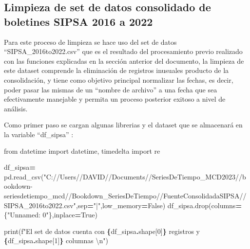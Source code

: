 \documentclass[
]{book}
\newenvironment{Shaded}{\begin{snugshade}}{\end{snugshade}}
\newcommand{\BuiltInTok}[1]{#1}
\newcommand{\CharTok}[1]{\textcolor[rgb]{0.31,0.60,0.02}{#1}}
\newcommand{\DecValTok}[1]{\textcolor[rgb]{0.00,0.00,0.81}{#1}}
\newcommand{\ImportTok}[1]{#1}
\newcommand{\NormalTok}[1]{#1}
\newcommand{\OperatorTok}[1]{\textcolor[rgb]{0.81,0.36,0.00}{\textbf{#1}}}
\newcommand{\SpecialCharTok}[1]{\textcolor[rgb]{0.81,0.36,0.00}{\textbf{#1}}}
\newcommand{\SpecialStringTok}[1]{\textcolor[rgb]{0.31,0.60,0.02}{#1}}
\newcommand{\StringTok}[1]{\textcolor[rgb]{0.31,0.60,0.02}{#1}}
\newcommand{\VariableTok}[1]{\textcolor[rgb]{0.00,0.00,0.00}{#1}}
\begin{document}
\hypertarget{limpieza-de-set-de-datos-consolidado-de-boletines-sipsa-2016-a-2022}{%
\subsection{Limpieza de set de datos consolidado de boletines SIPSA 2016 a 2022}\label{limpieza-de-set-de-datos-consolidado-de-boletines-sipsa-2016-a-2022}}

Para este proceso de limpieza se hace uso del set de datos ``SIPSA\_2016to2022.csv'' que es el resultado del procesamiento previo realizado con las funciones explicadas en la sección anterior del documento, la limpieza de este dataset comprende la eliminación de registros inusuales producto de la consolidación, y tiene como objetivo principal normalizar las fechas, es decir, poder pasar las mismas de un ``nombre de archivo'' a una fecha que sea efectivamente manejable y permita un proceso posterior exitoso a nivel de análisis.

Como primer paso se cargan algunas librerias y el dataset que se almacenará en la variable ``df\_sipsa'' :

\begin{Shaded}
\begin{Highlighting}[]

\ImportTok{from}\NormalTok{ datetime }\ImportTok{import}\NormalTok{ datetime, timedelta}
\ImportTok{import}\NormalTok{ re }

\NormalTok{df\_sipsa}\OperatorTok{=}\NormalTok{ pd.read\_csv(}\StringTok{"C://Users//DAVID//Documents//SeriesDeTiempo\_MCD2023//bookdown{-}seriesdetiempo\_mcd//Bookdown\_SeriesDeTiempo//FuenteConsolidadaSIPSA//SIPSA\_2016to2022.csv"}\NormalTok{,sep}\OperatorTok{=}\StringTok{"|"}\NormalTok{,low\_memory}\OperatorTok{=}\VariableTok{False}\NormalTok{)}
\NormalTok{df\_sipsa.drop(columns}\OperatorTok{=}\NormalTok{\{}\StringTok{"Unnamed: 0"}\NormalTok{\},inplace}\OperatorTok{=}\VariableTok{True}\NormalTok{)}

\BuiltInTok{print}\NormalTok{(}\SpecialStringTok{f"El set de datos cuenta con }\SpecialCharTok{\{}\NormalTok{df\_sipsa}\SpecialCharTok{.}\NormalTok{shape[}\DecValTok{0}\NormalTok{]}\SpecialCharTok{\}}\SpecialStringTok{ registros y }\SpecialCharTok{\{}\NormalTok{df\_sipsa}\SpecialCharTok{.}\NormalTok{shape[}\DecValTok{1}\NormalTok{]}\SpecialCharTok{\}}\SpecialStringTok{ columnas }\CharTok{\textbackslash{}n}\SpecialStringTok{"}\NormalTok{)}
\end{Highlighting}
\end{Shaded}
\end{document}
